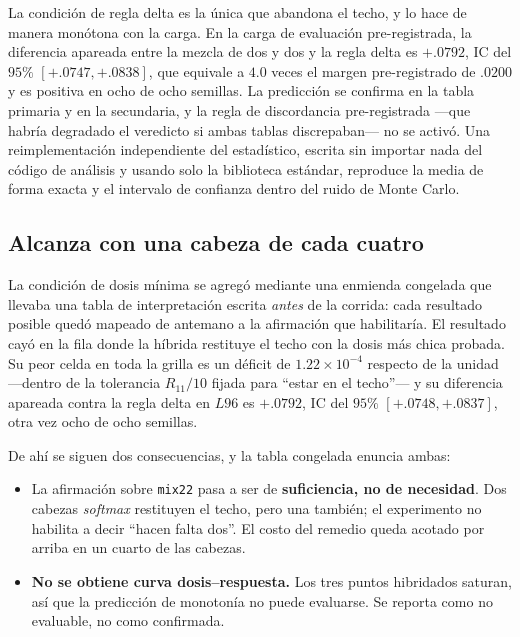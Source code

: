\documentclass[jou,11pt,donotrepeattitle]{apa7}
\begin{document}
La condici\'on de regla delta es la \'unica que abandona el techo, y lo hace de manera
mon\'otona con la carga. En la carga de evaluaci\'on pre-registrada, la diferencia apareada
entre la mezcla de dos y dos y la regla delta es $+.0792$, IC del $95\%$ $[+.0747, +.0838]$, que
equivale a $4.0$ veces el margen pre-registrado de $.0200$ y es positiva en ocho de ocho
semillas. La predicci\'on se confirma en la tabla primaria y en la secundaria, y la regla de
discordancia pre-registrada ---que habr\'ia degradado el veredicto si ambas tablas
discrepaban--- no se activ\'o. Una reimplementaci\'on independiente del estad\'istico, escrita
sin importar nada del c\'odigo de an\'alisis y usando solo la biblioteca est\'andar, reproduce
la media de forma exacta y el intervalo de confianza dentro del ruido de Monte Carlo.

\subsection{Alcanza con una cabeza de cada cuatro}

La condici\'on de dosis m\'inima se agreg\'o mediante una enmienda congelada que llevaba una
tabla de interpretaci\'on escrita \emph{antes} de la corrida: cada resultado posible qued\'o
mapeado de antemano a la afirmaci\'on que habilitar\'ia. El resultado cay\'o en la fila donde la
h\'ibrida restituye el techo con la dosis m\'as chica probada. Su peor celda en toda la grilla
es un d\'eficit de $1.22\times10^{-4}$ respecto de la unidad ---dentro de la tolerancia
$R_{11}/10$ fijada para \enquote{estar en el techo}--- y su diferencia apareada contra la regla
delta en $L96$ es $+.0792$, IC del $95\%$ $[+.0748, +.0837]$, otra vez ocho de ocho semillas.

De ah\'i se siguen dos consecuencias, y la tabla congelada enuncia ambas:

\begin{itemize}
  \item La afirmaci\'on sobre \texttt{mix22} pasa a ser de \textbf{suficiencia, no de
        necesidad}. Dos cabezas \emph{softmax} restituyen el techo, pero una tambi\'en; el
        experimento no habilita a decir \enquote{hacen falta dos}. El costo del remedio queda
        acotado por arriba en un cuarto de las cabezas.
  \item \textbf{No se obtiene curva dosis--respuesta.} Los tres puntos hibridados saturan, as\'i
        que la predicci\'on de monoton\'ia no puede evaluarse. Se reporta como no evaluable, no
        como confirmada.
\end{itemize}
\end{document}
